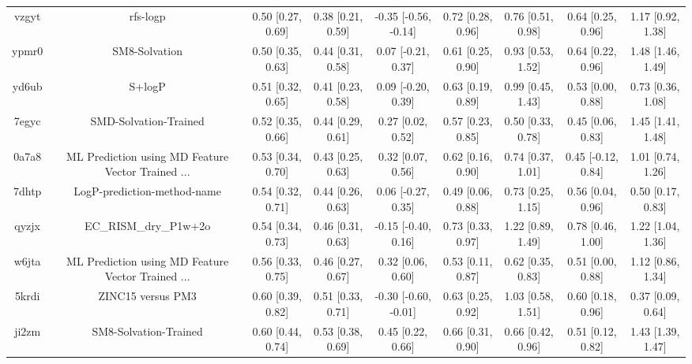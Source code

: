 \documentclass{article}
\begin{document}
\begin{center}
\begin{longtable}{|ccccccccc|}
 vzgyt &                                           rfs-logp &  0.50 [0.27, 0.69] &  0.38 [0.21, 0.59] &  -0.35 [-0.56, -0.14] &  0.72 [0.28, 0.96] &    0.76 [0.51, 0.98] &    0.64 [0.25, 0.96] &     1.17 [0.92, 1.38] \\
 ypmr0 &                                      SM8-Solvation &  0.50 [0.35, 0.63] &  0.44 [0.31, 0.58] &    0.07 [-0.21, 0.37] &  0.61 [0.25, 0.90] &    0.93 [0.53, 1.52] &    0.64 [0.22, 0.96] &     1.48 [1.46, 1.49] \\
 yd6ub &                                             S+logP &  0.51 [0.32, 0.65] &  0.41 [0.23, 0.58] &    0.09 [-0.20, 0.39] &  0.63 [0.19, 0.89] &    0.99 [0.45, 1.43] &    0.53 [0.00, 0.88] &     0.73 [0.36, 1.08] \\
 7egyc &                              SMD-Solvation-Trained &  0.52 [0.35, 0.66] &  0.44 [0.29, 0.61] &     0.27 [0.02, 0.52] &  0.57 [0.23, 0.85] &    0.50 [0.33, 0.78] &    0.45 [0.06, 0.83] &     1.45 [1.41, 1.48] \\
 0a7a8 &  ML Prediction using MD Feature Vector Trained ... &  0.53 [0.34, 0.70] &  0.43 [0.25, 0.63] &     0.32 [0.07, 0.56] &  0.62 [0.16, 0.90] &    0.74 [0.37, 1.01] &   0.45 [-0.12, 0.84] &     1.01 [0.74, 1.26] \\
 7dhtp &                        LogP-prediction-method-name &  0.54 [0.32, 0.71] &  0.44 [0.26, 0.63] &    0.06 [-0.27, 0.35] &  0.49 [0.06, 0.88] &    0.73 [0.25, 1.15] &    0.56 [0.04, 0.96] &     0.50 [0.17, 0.83] \\
 qyzjx &                              EC\_RISM\_dry\_P1w+2o &  0.54 [0.34, 0.73] &  0.46 [0.31, 0.63] &   -0.15 [-0.40, 0.16] &  0.73 [0.33, 0.97] &    1.22 [0.89, 1.49] &    0.78 [0.46, 1.00] &     1.22 [1.04, 1.36] \\
 w6jta &  ML Prediction using MD Feature Vector Trained ... &  0.56 [0.33, 0.75] &  0.46 [0.27, 0.67] &     0.32 [0.06, 0.60] &  0.53 [0.11, 0.87] &    0.62 [0.35, 0.83] &    0.51 [0.00, 0.88] &     1.12 [0.86, 1.34] \\
 5krdi &                                  ZINC15 versus PM3 &  0.60 [0.39, 0.82] &  0.51 [0.33, 0.71] &  -0.30 [-0.60, -0.01] &  0.63 [0.25, 0.92] &    1.03 [0.58, 1.51] &    0.60 [0.18, 0.96] &     0.37 [0.09, 0.64] \\
 ji2zm &                              SM8-Solvation-Trained &  0.60 [0.44, 0.74] &  0.53 [0.38, 0.69] &     0.45 [0.22, 0.66] &  0.66 [0.31, 0.90] &    0.66 [0.42, 0.96] &    0.51 [0.12, 0.82] &     1.43 [1.39, 1.47] \\

\end{longtable}
\end{center}
\end{document}
